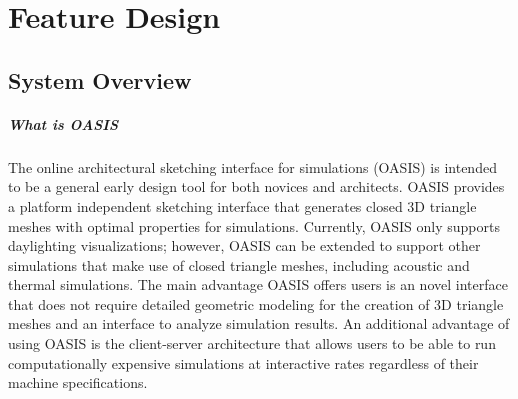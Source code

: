 \chapter{Feature Design} \label{sec:feature}


\section{System Overview}

\paragraph{What is OASIS}
The online architectural sketching interface for simulations (OASIS) is intended to be a  general early design tool for both novices and architects. OASIS provides a platform independent sketching interface that generates closed 3D triangle meshes with optimal properties for simulations. Currently, OASIS only supports daylighting visualizations; however, OASIS can be extended to support other simulations that make use of closed triangle meshes, including acoustic and thermal simulations. The main advantage OASIS offers users is an novel interface that does not require detailed geometric modeling for the creation of 3D triangle meshes and an interface to analyze simulation results. An additional advantage of using OASIS is the client-server architecture that allows users to be able to run computationally expensive simulations at interactive rates regardless of their machine specifications.

